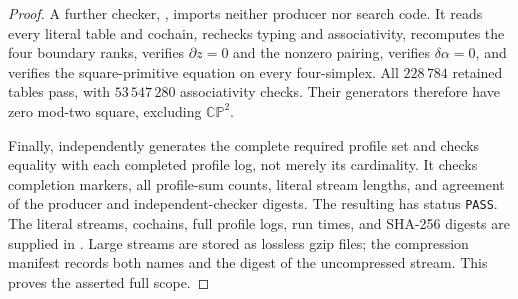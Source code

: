\begin{proof}
A further checker, ,
imports neither producer nor search code. It reads every literal
table and cochain, rechecks typing and associativity, recomputes
the four boundary ranks, verifies $\partial z=0$ and the nonzero
pairing, verifies $\delta\alpha=0$, and verifies the square-primitive
equation on every four-simplex. All $228\,784$ retained tables
pass, with $53\,547\,280$ associativity checks. Their generators
therefore have zero mod-two square, excluding $\mathbb{CP}^2$.

Finally,  independently generates
the complete required profile set and checks equality with each
completed profile log, not merely its cardinality. It checks
completion markers, all profile-sum counts, literal stream lengths,
and agreement of the producer and independent-checker digests.
The resulting  has status
\texttt{PASS}. The literal streams, cochains, full profile logs,
run times, and SHA-256 digests are supplied in
. Large streams are stored as lossless gzip
files; the compression manifest records both names and the digest
of the uncompressed stream. This proves the asserted full scope.
\end{proof}

